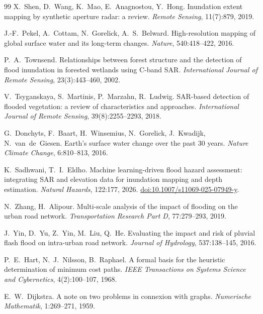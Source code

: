 \documentclass[11pt,a4paper]{article}
\begin{document}
\begin{thebibliography}{99}
X.~Shen, D.~Wang, K.~Mao, E.~Anagnostou, Y.~Hong.
Inundation extent mapping by synthetic aperture radar: a review.
\emph{Remote Sensing}, 11(7):879, 2019.

J.-F.~Pekel, A.~Cottam, N.~Gorelick, A.~S.~Belward.
High-resolution mapping of global surface water and its long-term changes.
\emph{Nature}, 540:418--422, 2016.

P.~A.~Townsend.
Relationships between forest structure and the detection of flood inundation in
forested wetlands using C-band SAR.
\emph{International Journal of Remote Sensing}, 23(3):443--460, 2002.

V.~Tsyganskaya, S.~Martinis, P.~Marzahn, R.~Ludwig.
SAR-based detection of flooded vegetation: a review of characteristics and
approaches.
\emph{International Journal of Remote Sensing}, 39(8):2255--2293, 2018.

G.~Donchyts, F.~Baart, H.~Winsemius, N.~Gorelick, J.~Kwadijk, N.~van~de~Giesen.
Earth's surface water change over the past 30 years.
\emph{Nature Climate Change}, 6:810--813, 2016.

K.~Sadhwani, T.~I.~Eldho.
Machine learning-driven flood hazard assessment: integrating SAR and elevation
data for inundation mapping and depth estimation.
\emph{Natural Hazards}, 122:177, 2026.
\href{https://doi.org/10.1007/s11069-025-07949-y}{doi:10.1007/s11069-025-07949-y}.

N.~Zhang, H.~Alipour.
Multi-scale analysis of the impact of flooding on the urban road network.
\emph{Transportation Research Part D}, 77:279--293, 2019.

J.~Yin, D.~Yu, Z.~Yin, M.~Liu, Q.~He.
Evaluating the impact and risk of pluvial flash flood on intra-urban road network.
\emph{Journal of Hydrology}, 537:138--145, 2016.

P.~E.~Hart, N.~J.~Nilsson, B.~Raphael.
A formal basis for the heuristic determination of minimum cost paths.
\emph{IEEE Transactions on Systems Science and Cybernetics}, 4(2):100--107, 1968.

E.~W.~Dijkstra.
A note on two problems in connexion with graphs.
\emph{Numerische Mathematik}, 1:269--271, 1959.


\end{thebibliography}
\end{document}
